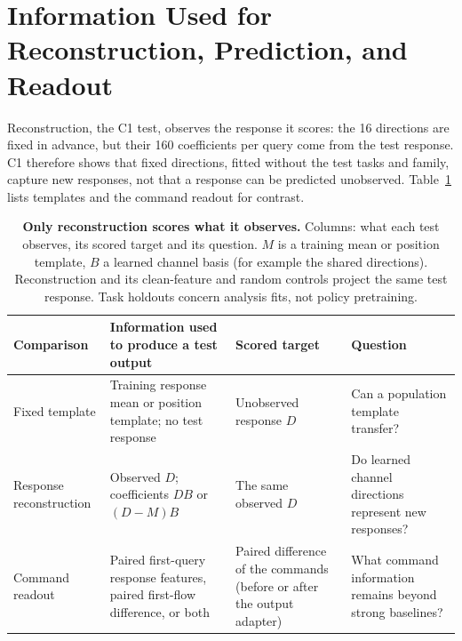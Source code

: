 \section{Information Used for Reconstruction, Prediction, and Readout}
\label{sec:information-budget}
Reconstruction, the C1 test, observes the response it scores: the 16 directions are fixed in advance, but their 160 coefficients per query come from the test response. C1 therefore shows that fixed directions, fitted without the test tasks and family, capture new responses, not that a response can be predicted unobserved. Table~\ref{tab:supp-information-budget} lists templates and the command readout for contrast.

\begin{table}[t]
\caption{\textbf{Only reconstruction scores what it observes.} Columns: what each test observes, its scored target and its question. $M$ is a training mean or position template, $B$ a learned channel basis (for example the shared directions). Reconstruction and its clean-feature and random controls project the same test response. Task holdouts concern analysis fits, not policy pretraining.}

\centering\footnotesize
\setlength{\tabcolsep}{3pt}
\renewcommand{\arraystretch}{1.12}
\begin{tabular}{p{}p{}p{}p{}}
\toprule
Comparison & Information used to produce a test output & Scored target & Question\\
\midrule
Fixed template & Training response mean or position template; no test response & Unobserved response $D$ & Can a population template transfer?\\
Response reconstruction & Observed $D$; coefficients $DB$ or $(D-M)B$ & The same observed $D$ & Do learned channel directions represent new responses?\\
Command readout & Paired first-query response features, paired first-flow difference, or both & Paired difference of the commands (before or after the output adapter) & What command information remains beyond strong baselines?\\
\bottomrule
\end{tabular}

\label{tab:supp-information-budget}
\end{table}

